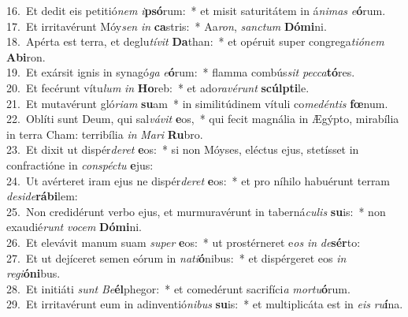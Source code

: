 {16.~}Et dedit eis petitió\textit{nem} \textit{i}\textbf{psó}rum:~* et misit saturitátem in á\textit{ni}\textit{mas} \textit{e}\textbf{ó}rum.\\
{17.~}Et irritavérunt Móy\textit{sen} \textit{in} \textbf{ca}stris:~* Aa\textit{ron}, \textit{san}\textit{ctum} \textbf{Dó}\textbf{mi}ni.\\
{18.~}Apérta est terra, et deglu\textit{tí}\textit{vit} \textbf{Da}than:~* et opéruit super congrega\textit{ti}\textit{ó}\textit{nem} \textbf{A}\textbf{bi}ron.\\
{19.~}Et exársit ignis in synagó\textit{ga} \textit{e}\textbf{ó}rum:~* flamma combús\textit{sit} \textit{pec}\textit{ca}\textbf{tó}res.\\
{20.~}Et fecérunt vítu\textit{lum} \textit{in} \textbf{Ho}reb:~* et ado\textit{ra}\textit{vé}\textit{runt} \textbf{scúl}\textbf{pti}le.\\
{21.~}Et mutavérunt gló\textit{ri}\textit{am} \textbf{su}am~* in similitúdinem vítuli co\textit{me}\textit{dén}\textit{tis} \textbf{fœ}num.\\
{22.~}Oblíti sunt Deum, qui sal\textit{vá}\textit{vit} \textbf{e}os,~* qui fecit magnália in Ægýpto, mirabília in terra Cham: terribília \textit{in} \textit{Ma}\textit{ri} \textbf{Ru}bro.\\
{23.~}Et dixit ut dispér\textit{de}\textit{ret} \textbf{e}os:~* si non Móyses, eléctus ejus, stetísset in confractióne in \textit{con}\textit{spé}\textit{ctu} \textbf{e}jus:\\
{24.~}Ut avérteret iram ejus ne dispér\textit{de}\textit{ret} \textbf{e}os:~* et pro níhilo habuérunt terram \textit{de}\textit{si}\textit{de}\textbf{rá}\textbf{bi}lem:\\
{25.~}Non credidérunt verbo ejus, et murmuravérunt in taberná\textit{cu}\textit{lis} \textbf{su}is:~* non exaudié\textit{runt} \textit{vo}\textit{cem} \textbf{Dó}\textbf{mi}ni.\\
{26.~}Et elevávit manum suam \textit{su}\textit{per} \textbf{e}os:~* ut prostérneret e\textit{os} \textit{in} \textit{de}\textbf{sér}to:\\
{27.~}Et ut dejíceret semen eórum in \textit{na}\textit{ti}\textbf{ó}nibus:~* et dispérgeret eos \textit{in} \textit{re}\textit{gi}\textbf{ó}\textbf{ni}bus.\\
{28.~}Et initiáti \textit{sunt} \textit{Be}\textbf{él}phegor:~* et comedérunt sacrifíci\textit{a} \textit{mor}\textit{tu}\textbf{ó}rum.\\
{29.~}Et irritavérunt eum in adinventió\textit{ni}\textit{bus} \textbf{su}is:~* et multiplicáta est in \textit{e}\textit{is} \textit{ru}\textbf{í}na.\\
